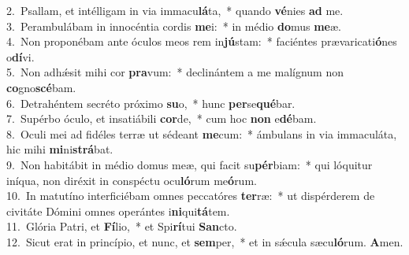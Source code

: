 {2.~}Psallam, et intélligam in via immacu\textbf{lá}ta,~* quando \textbf{vé}nies \textbf{ad} me.\\
{3.~}Perambulábam in innocéntia cordis \textbf{me}i:~* in médio \textbf{do}mus \textbf{me}æ.\\
{4.~}Non proponébam ante óculos meos rem in\textbf{jú}stam:~* faciéntes prævaricati\textbf{ó}nes o\textbf{dí}vi.\\
{5.~}Non adhǽsit mihi cor \textbf{pra}vum:~* declinántem a me malígnum non \textbf{co}gno\textbf{scé}bam.\\
{6.~}Detrahéntem secréto próximo \textbf{su}o,~* hunc \textbf{per}se\textbf{qué}bar.\\
{7.~}Supérbo óculo, et insatiábili \textbf{cor}de,~* cum hoc \textbf{non} e\textbf{dé}bam.\\
{8.~}Oculi mei ad fidéles terræ ut sédeant \textbf{me}cum:~* ámbulans in via immaculáta, hic mihi \textbf{mi}ni\textbf{strá}bat.\\
{9.~}Non habitábit in médio domus meæ, qui facit su\textbf{pér}biam:~* qui lóquitur iníqua, non diréxit in conspéctu ocu\textbf{ló}rum me\textbf{ó}rum.\\
{10.~}In matutíno interficiébam omnes peccatóres \textbf{ter}ræ:~* ut dispérderem de civitáte Dómini omnes operántes i\textbf{ni}qui\textbf{tá}tem.\\
{11.~}Glória Patri, et \textbf{Fí}lio,~* et Spi\textbf{rí}tui \textbf{San}cto.\\
{12.~}Sicut erat in princípio, et nunc, et \textbf{sem}per,~* et in sǽcula sæcu\textbf{ló}rum. \textbf{A}men.\\
